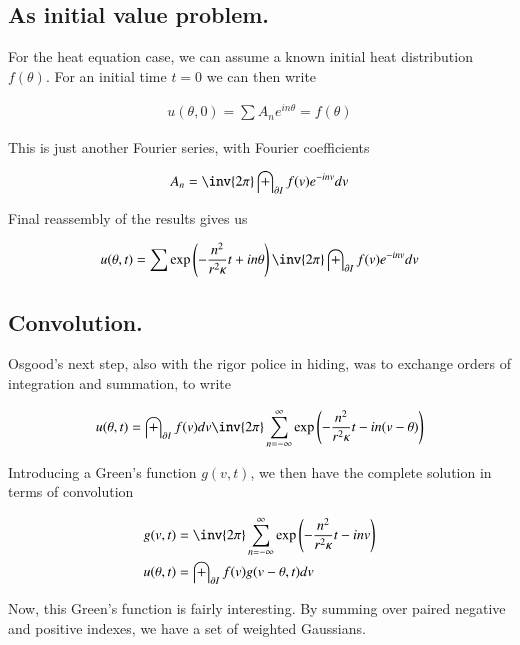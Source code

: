 \documentclass{article}
\begin{document}
\subsection{ As initial value problem. }

For the heat equation case, we can assume a known initial heat distribution 
$f(\theta)$.
For an initial time $t=0$ we can then write

\begin{align*}
u(\theta, 0) = \sum A_n e^{i n \theta} = f(\theta)
\end{align*}

This is just another Fourier series, with Fourier coefficients

\begin{align*}
A_n = \inv{2\pi} \int_{\partial I} f(v) e^{-i n v} dv
\end{align*}

Final reassembly of the results gives us

\begin{align}
u(\theta, t) = \sum \exp\left(- \frac{n^2}{ r^2 \kappa } t + i n \theta\right) \inv{2\pi} \int_{\partial I} f(v) e^{-i n v} dv
\end{align}

\subsection{ Convolution. }

Osgood's next step, also with the rigor police in hiding, was to exchange orders of integration and summation, to write

\begin{align*}
u(\theta, t) 
&= 
\int_{\partial I} f(v) dv \inv{2 \pi} \sum_{n=-\infty}^{\infty} \exp\left(- \frac{n^2}{ r^2 \kappa } t -i n (v -\theta)\right) \\
\end{align*}

Introducing a Green's function $g(v, t)$, we then have the complete solution in terms of convolution

\begin{align}\label{eqn:seriesGreens}
g( v , t ) &= \inv{2 \pi} \sum_{n=-\infty}^\infty \exp\left(- \frac{n^2}{ r^2 \kappa } t -i n v \right) \\
u(\theta, t) &= \int_{\partial I} f(v) g(v - \theta, t) dv 
\end{align}

Now, this Green's function is fairly interesting.  By summing over paired negative and positive indexes, we have a set of
weighted Gaussians.
\end{document}
